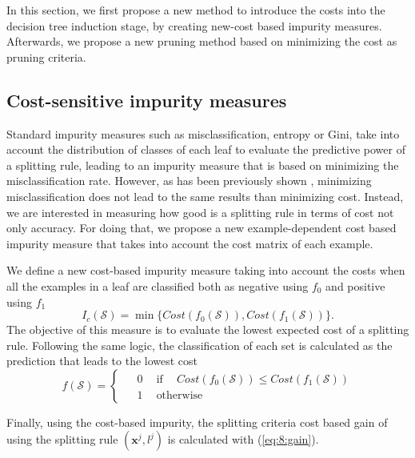   In this section, we first propose a new method to introduce the costs into the decision tree 
	induction stage, by creating new-cost based impurity measures. Afterwards, we propose a new 
	pruning method based on minimizing the cost as pruning criteria.

	\subsection{Cost-sensitive impurity measures}

		Standard impurity measures such as misclassification, entropy or Gini, take into account the 
		distribution of classes of each leaf to evaluate the predictive power of a splitting rule,
		leading to an impurity measure that is based on minimizing the misclassification rate. However, 
		as has been previously shown \citep{CorreaBahnsen2013}, minimizing misclassification does not 
		lead to the same results than minimizing cost. Instead, we are interested in measuring how good 
		is a splitting rule in terms of cost not only accuracy. For doing that, we propose a new 
		example-dependent cost based impurity measure that takes into account the cost matrix of each 
		example.

		We define a new cost-based impurity measure taking into account the costs when all the examples
		in a leaf are classified both as negative using $f_0$ and positive using $f_1$
		\begin{equation}\label{eq:8:cost_impurity}
			I_c(\mathcal{S}) = \min \bigg\{ Cost(f_0(\mathcal{S})), Cost(f_1(\mathcal{S})) \bigg\}.
		\end{equation}
		The objective of this measure is to evaluate the lowest expected cost of a splitting rule.
		Following the same logic, the classification of each set is calculated as the prediction that 
		leads to the lowest cost
	  \begin{equation}\label{eq:8:pred}
	    f(\mathcal{S}) = 
	    \begin{cases}
	      \phantom{-}0 \phantom{-} \mbox{if} \phantom{-} Cost(f_0(\mathcal{S})) \le 
        Cost(f_1(\mathcal{S}))\\
	      \phantom{-}1 \phantom{-}\mbox{otherwise}
	    \end{cases}
	  \end{equation}

		Finally, using the cost-based impurity, the splitting criteria cost based gain of using the 
		splitting rule $(\mathbf{x}^j,l^j)$ is calculated with (\ref{eq:8:gain}). 

